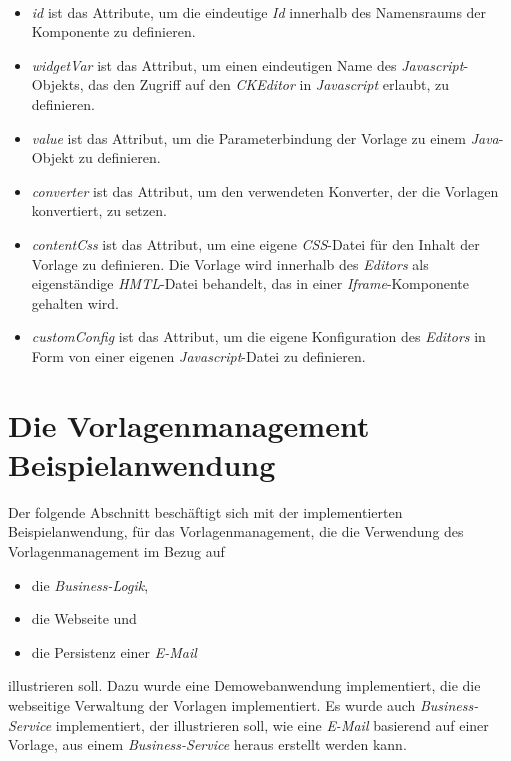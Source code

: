 \ \begin{itemize}
	\item\emph{id} ist das Attribute, um die eindeutige \emph{Id} innerhalb des Namensraums der Komponente zu definieren.
	\item\emph{widgetVar} ist das Attribut, um einen eindeutigen Name des \emph{Javascript}-Objekts, das den Zugriff auf den \emph{CKEditor} in \emph{Javascript} erlaubt, zu definieren.
	\item\emph{value} ist das Attribut, um die Parameterbindung der Vorlage zu einem \emph{Java}-Objekt zu definieren.
	\item\emph{converter} ist das Attribut, um den verwendeten Konverter, der die Vorlagen konvertiert, zu setzen.
	\item\emph{contentCss} ist das Attribut, um eine eigene \emph{CSS}-Datei für den Inhalt der Vorlage zu definieren. Die Vorlage wird innerhalb des \emph{Editors} als eigenständige \emph{HMTL}-Datei behandelt, das in einer \emph{Iframe}-Komponente gehalten wird.
	\item\emph{customConfig} ist das Attribut, um die eigene Konfiguration des \emph{Editors} in Form von einer eigenen \emph{Javascript}-Datei zu definieren. 
\end{itemize}

\section{Die Vorlagenmanagement Beispielanwendung}
Der folgende Abschnitt beschäftigt sich mit der implementierten Beispielanwendung, für das Vorlagenmanagement, die die Verwendung des Vorlagenmanagement im Bezug auf 
\begin{itemize}
	\item die \emph{Business-Logik},
	\item die Webseite und
	\item die Persistenz einer \emph{E-Mail}  
\end{itemize}
illustrieren soll. Dazu wurde eine Demowebanwendung implementiert, die die webseitige Verwaltung der Vorlagen implementiert. Es wurde auch \emph{Business-Service} implementiert, der illustrieren soll, wie eine \emph{E-Mail} basierend auf einer Vorlage, aus einem \emph{Business-Service} heraus erstellt werden kann. 

